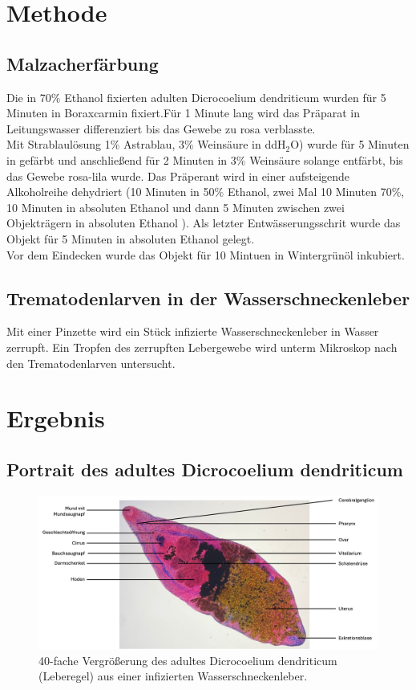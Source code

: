 \documentclass[oneside,10pt,a4paper]{report}
\begin{document}
			
		\section{Methode}
			\subsection{Malzacherfärbung}
			Die in 70$\%$ Ethanol fixierten adulten Dicrocoelium dendriticum wurden für 5 Minuten in Boraxcarmin fixiert.Für 1 Minute lang wird das Präparat in Leitungswasser differenziert bis das Gewebe zu rosa verblasste.\\
			Mit Strablaulösung 1$\%$ Astrablau, 3$\%$ Weinsäure in ddH$_2$O) wurde für 5 Minuten in gefärbt und anschließend für 2 Minuten in 3$\%$ Weinsäure solange entfärbt, bis das Gewebe rosa-lila wurde.
			Das Präperant wird in einer aufsteigende Alkoholreihe dehydriert (10 Minuten in 50$\%$ Ethanol, zwei Mal 10 Minuten 70$\%$, 10 Minuten in absoluten Ethanol und dann 5 Minuten zwischen zwei Objekträgern in absoluten Ethanol ). Als letzter Entwässerungsschrit wurde das Objekt für 5 Minuten in absoluten Ethanol gelegt.\\
			Vor dem Eindecken wurde das Objekt für 10 Mintuen in Wintergrünöl inkubiert.\\
			
			\subsection{Trematodenlarven in der Wasserschneckenleber}
				Mit einer Pinzette wird ein Stück infizierte Wasserschneckenleber in Wasser zerrupft. Ein Tropfen des zerrupften Lebergewebe wird unterm Mikroskop nach den Trematodenlarven untersucht.
				
		\section{Ergebnis}
			\subsection{Portrait des adultes Dicrocoelium dendriticum}
				\begin{figure}[H]
					\centering
					\includegraphics[scale=0.5]{Dicrocoelium dendriticum.png}
					\caption{40-fache Vergrößerung des adultes Dicrocoelium dendriticum (Leberegel) aus einer infizierten Wasserschneckenleber.}
					\label{fig: TrematodenMalzacherfärbung}
				\end{figure}
				
\end{document}
